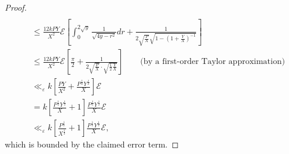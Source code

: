 \documentclass[12pt,letterpaper,reqno]{amsart}
\theoremstyle{plain}
\theoremstyle{definition}
\numberwithin{equation}{section}
\numberwithin{figure}{section}
\numberwithin{table}{section}
\newcommand{\lrp}[1]{\!\left(#1\right)}
\newcommand{\lrb}[1]{\!\left[#1\right]}
\newcommand{\EE}{\mathcal{E}}
\begin{document}
\begin{proof}
\begin{align}
{        } \\
        &\le \frac{12kPY}{X^2} 
            \EE
        \lrb{
            \int_0^{2 \sqrt{y}} \frac{1}{\sqrt{4y-r^2}} dr
            + 
            \frac{1}{2 \sqrt{\frac{P}{X}} \sqrt{1-\lrp{1+\frac{Y}{X}}^{-1}}}
        } \\
        &\le \frac{12kPY}{X^2} 
            \EE
        \lrb{
            \frac{\pi}{2}
            + 
            \frac{1}{2 \sqrt{\frac{P}{X}} \cdot 
            \sqrt{\frac{1}{2} \frac{Y}{X}}
            }
        } 
        \qquad 
        \text{(by a first-order Taylor approximation)}
        \\
        &\ll_\varepsilon  k 
        \lrb{
            \frac{PY}{X^2}
            + 
            \frac{P^\frac{1}{2}Y^\frac{1}{2}}{X}
        } \EE \\
        &= k \lrb{\frac{P^\frac{1}{2}Y^\frac{1}{2}}{X}+1}\frac{P^\frac{1}{2}Y^\frac{1}{2}}{X} \EE \\
        &\ll_\varepsilon  k \lrb{\frac{P^\frac{1}{2}}{X^\frac{1}{2}}+1}\frac{P^\frac{1}{2}Y^\frac{1}{2}}{X} \EE,
    \end{align}
    which is bounded by the claimed error term.



\end{proof}
\end{document}
